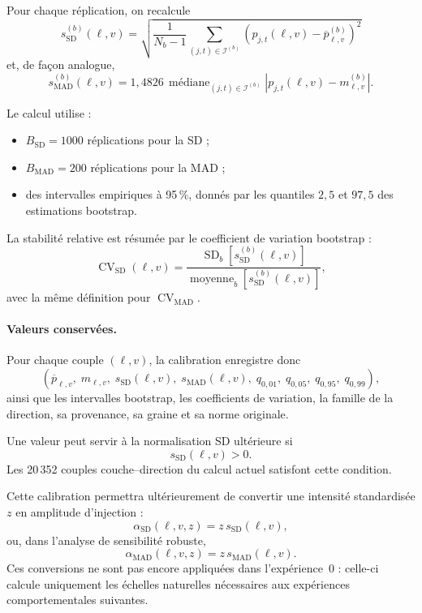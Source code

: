 \documentclass[a4paper,10pt]{article}
\newcommand{\pc}[1]{#1\,\%}
\begin{document}
Pour chaque réplication, on recalcule
\[
s_{\mathrm{SD}}^{(b)}(\ell,v)
=
\sqrt{
\frac{1}{N_b-1}
\sum_{(j,t)\in\mathcal{I}^{(b)}}
\left(
p_{j,t}(\ell,v)
-
\overline{p}_{\ell,v}^{(b)}
\right)^2
}
\]
et, de façon analogue,
\[
s_{\mathrm{MAD}}^{(b)}(\ell,v)
=
1{,}4826\,
\operatorname{médiane}_{(j,t)\in\mathcal{I}^{(b)}}
\left|
p_{j,t}(\ell,v)-m_{\ell,v}^{(b)}
\right|.
\]

Le calcul utilise :

\begin{itemize}
  \item $B_{\mathrm{SD}}=1000$ réplications pour la SD ;
  \item $B_{\mathrm{MAD}}=200$ réplications pour la MAD ;
  \item des intervalles empiriques à \pc{95}, donnés par les quantiles
        $2{,}5$ et $97{,}5$ des estimations bootstrap.
\end{itemize}

La stabilité relative est résumée par le coefficient de variation bootstrap :
\[
\operatorname{CV}_{\mathrm{SD}}(\ell,v)
=
\frac{
\operatorname{SD}_{b}
\left[
s_{\mathrm{SD}}^{(b)}(\ell,v)
\right]
}{
\operatorname{moyenne}_{b}
\left[
s_{\mathrm{SD}}^{(b)}(\ell,v)
\right]
},
\]
avec la même définition pour $\operatorname{CV}_{\mathrm{MAD}}$.

\paragraph{Valeurs conservées.}

Pour chaque couple $(\ell,v)$, la calibration enregistre donc
\[
\left(
\overline{p}_{\ell,v},
\;
m_{\ell,v},
\;
s_{\mathrm{SD}}(\ell,v),
\;
s_{\mathrm{MAD}}(\ell,v),
\;
q_{0{,}01},
\;
q_{0{,}05},
\;
q_{0{,}95},
\;
q_{0{,}99}
\right),
\]
ainsi que les intervalles bootstrap, les coefficients de variation, la famille
de la direction, sa provenance, sa graine et sa norme originale.

Une valeur peut servir à la normalisation SD ultérieure si
\[
s_{\mathrm{SD}}(\ell,v)>0.
\]
Les 20\,352 couples couche--direction du calcul actuel satisfont cette
condition.

Cette calibration permettra ultérieurement de convertir une intensité
standardisée $z$ en amplitude d'injection :
\[
\alpha_{\mathrm{SD}}(\ell,v,z)
=
z\,s_{\mathrm{SD}}(\ell,v),
\]
ou, dans l'analyse de sensibilité robuste,
\[
\alpha_{\mathrm{MAD}}(\ell,v,z)
=
z\,s_{\mathrm{MAD}}(\ell,v).
\]
Ces conversions ne sont pas encore appliquées dans l'expérience~0 : celle-ci
calcule uniquement les échelles naturelles nécessaires aux expériences
comportementales suivantes.
\end{document}
